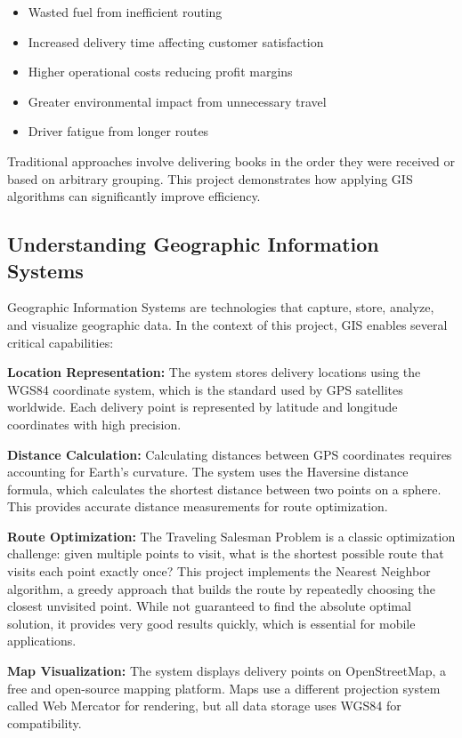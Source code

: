 \documentclass[12pt,a4paper]{article}
\begin{document}
\begin{itemize}
    \item Wasted fuel from inefficient routing
    \item Increased delivery time affecting customer satisfaction
    \item Higher operational costs reducing profit margins
    \item Greater environmental impact from unnecessary travel
    \item Driver fatigue from longer routes
\end{itemize}

Traditional approaches involve delivering books in the order they were received or based on arbitrary grouping. This project demonstrates how applying GIS algorithms can significantly improve efficiency.

\subsection{Understanding Geographic Information Systems}

Geographic Information Systems are technologies that capture, store, analyze, and visualize geographic data. In the context of this project, GIS enables several critical capabilities:

\textbf{Location Representation:} The system stores delivery locations using the WGS84 coordinate system, which is the standard used by GPS satellites worldwide. Each delivery point is represented by latitude and longitude coordinates with high precision.

\textbf{Distance Calculation:} Calculating distances between GPS coordinates requires accounting for Earth's curvature. The system uses the Haversine distance formula, which calculates the shortest distance between two points on a sphere. This provides accurate distance measurements for route optimization.

\textbf{Route Optimization:} The Traveling Salesman Problem is a classic optimization challenge: given multiple points to visit, what is the shortest possible route that visits each point exactly once? This project implements the Nearest Neighbor algorithm, a greedy approach that builds the route by repeatedly choosing the closest unvisited point. While not guaranteed to find the absolute optimal solution, it provides very good results quickly, which is essential for mobile applications.

\textbf{Map Visualization:} The system displays delivery points on OpenStreetMap, a free and open-source mapping platform. Maps use a different projection system called Web Mercator for rendering, but all data storage uses WGS84 for compatibility.
\end{document}
